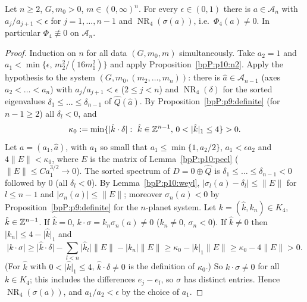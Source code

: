 \begin{theorem}\label{bpP:p10:good-point}
Let $n\ge2$, $G,m_0>0$, $m\in(0,\infty)^n$. For every $\epsilon\in(0,1)$ there is $a\in\mathcal A_n$ with $a_j/a_{j+1}<\epsilon$ for $j=1,\dots,n-1$ and $\operatorname{NR}_4(\sigma(a))$, i.e.\ $\Phi_4(a)\ne0$. In particular $\Phi_4\not\equiv0$ on $\mathcal A_n$.
\end{theorem}
\begin{proof}
Induction on $n$ for all data $(G,m_0,m)$ simultaneously.
\label{stepP:p10:gp-base} Take $a_2=1$ and $a_1<\min\{\epsilon,\,m_2^2/(16m_1^2)\}$ and apply Proposition~\ref{bpP:p10:n2}.
\label{stepP:p10:gp-choice} Apply the hypothesis to the system $(G,m_0,(m_2,\dots,m_n))$: there is $\hat a\in\mathcal A_{n-1}$ (axes $a_2<\dots<a_n$) with $a_j/a_{j+1}<\epsilon$ ($2\le j<n$) and $\operatorname{NR}_4(\delta)$ for the sorted eigenvalues $\delta_1\le\dots\le\delta_{n-1}$ of $\hat Q(\hat a)$. By Proposition~\ref{bpP:p9:definite} (for $n-1\ge2$) all $\delta_l<0$, and
\[\kappa_0:=\min\{\lvert\hat k\cdot\delta\rvert:\ \hat k\in\mathbb{Z}^{n-1},\,0<\lvert\hat k\rvert_1\le4\}>0 .\]
Let $a=(a_1,\hat a)$, with $a_1$ so small that $a_1\le\min\{1,a_2/2\}$, $a_1<\epsilon a_2$ and $4\lVert E\rVert<\kappa_0$, where $E$ is the matrix of Lemma~\ref{bpP:p10:peel} ($\lVert E\rVert\le Ca_1^{3/2}\to0$).
\label{stepP:p10:gp-loc} The sorted spectrum of $D=0\oplus\hat Q$ is $\delta_1\le\dots\le\delta_{n-1}<0$ followed by $0$ (all $\delta_l<0$). By Lemma~\ref{bpP:p10:weyl}, $\lvert\sigma_l(a)-\delta_l\rvert\le\lVert E\rVert$ for $l\le n-1$ and $\lvert\sigma_n(a)\rvert\le\lVert E\rVert$; moreover $\sigma_n(a)<0$ by Proposition~\ref{bpP:p9:definite} for the $n$-planet system.
\label{stepP:p10:gp-nr} Let $k=(\hat k,k_n)\in K_4$, $\hat k\in\mathbb{Z}^{n-1}$. If $\hat k=0$, $k\cdot\sigma=k_n\sigma_n(a)\ne0$ ($k_n\ne0$, $\sigma_n<0$). If $\hat k\ne0$ then $\lvert k_n\rvert\le4-\lvert\hat k\rvert_1$ and
\[\lvert k\cdot\sigma\rvert\ge\lvert\hat k\cdot\delta\rvert-\sum_{l<n}\lvert\hat k_l\rvert\lVert E\rVert-\lvert k_n\rvert\lVert E\rVert\ge\kappa_0-\lvert k\rvert_1\lVert E\rVert\ge\kappa_0-4\lVert E\rVert>0.\]
(For $\hat k$ with $0<\lvert\hat k\rvert_1\le4$, $\hat k\cdot\delta\ne0$ is the definition of $\kappa_0$.) So $k\cdot\sigma\ne0$ for all $k\in K_4$; this includes the differences $e_j-e_l$, so $\sigma$ has distinct entries. Hence $\operatorname{NR}_4(\sigma(a))$, and $a_1/a_2<\epsilon$ by the choice of $a_1$.
\end{proof}

